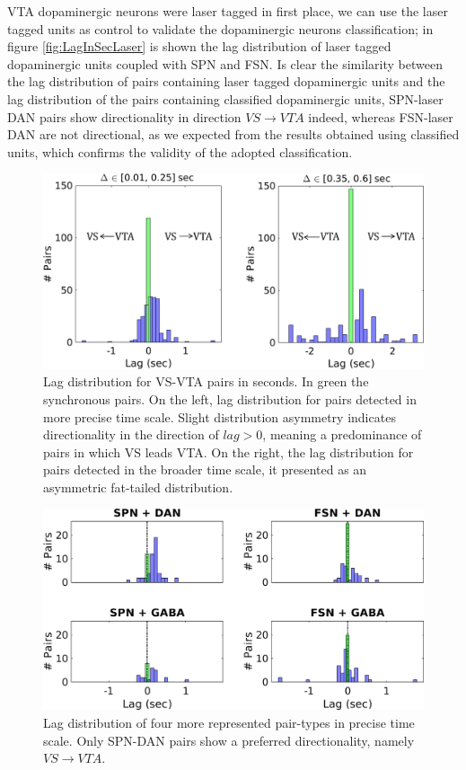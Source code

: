 VTA dopaminergic neurons were laser tagged in first place, we can use the laser tagged units as control to validate the dopaminergic neurons classification; in figure \ref{fig:LagInSecLaser} is shown the lag distribution of laser tagged dopaminergic units coupled with SPN and FSN. Is clear the similarity between the lag distribution of pairs containing laser tagged dopaminergic units and the lag distribution of the pairs containing classified dopaminergic units, SPN-laser DAN pairs show directionality in direction $VS\rightarrow VTA$ indeed, whereas FSN-laser DAN are not directional, as we expected from the results obtained using classified units, which confirms the validity of the adopted classification.\\
\begin{figure}[H]
\centering
\includegraphics[scale=0.6]{figures/LagGeneral1.pdf}
\caption{Lag distribution for VS-VTA pairs in seconds. In green the synchronous pairs. On the left, lag distribution for pairs detected in more precise time scale. Slight distribution asymmetry indicates directionality in the direction of $lag > 0$, meaning a predominance of pairs in which VS leads VTA. On the right, the lag distribution for pairs detected in the broader time scale, it presented as an asymmetric fat-tailed distribution.}
\label{fig:LagInSecAll}
\end{figure}
\begin{figure}[H]
\centering
\includegraphics[scale=0.5]{figures/LagSec4Typo3VS.png}
\caption{Lag distribution of four more represented pair-types in precise time scale. Only SPN-DAN pairs show a preferred directionality, namely $VS\rightarrow VTA$.}
\label{fig:LagInSec4typo}
\end{figure}
